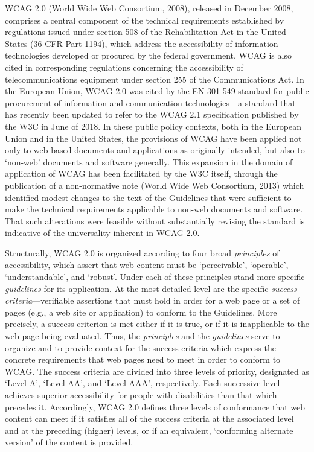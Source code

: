 \documentclass[11.5pt]{sig-alternate} %
\begin{document}
\begin{large}
WCAG 2.0 (World Wide Web Consortium, 2008), released in December 2008, comprises a central component of the technical requirements established by regulations issued under section 508 of the Rehabilitation Act in the United States (36 CFR Part 1194), which address the accessibility of information technologies developed or procured by the federal government. WCAG is also cited in corresponding regulations concerning the accessibility of telecommunications equipment under section 255 of the Communications Act. In the European Union, WCAG 2.0 was cited by the EN 301 549 standard for public procurement of information and communication technologies—a standard that has recently been updated to refer to the WCAG 2.1 specification published by the W3C in June of 2018. In these public policy contexts, both in the European Union and in the United States, the provisions of WCAG have been applied not only to web-based documents and applications as originally intended, but also to ‘non-web’ documents and software generally. This expansion in the domain of application of WCAG has been facilitated by the W3C itself, through the publication of a non-normative note (World Wide Web Consortium, 2013) which identified modest changes to the text of the Guidelines that were sufficient to make the technical requirements applicable to non-web documents and software. That such alterations were feasible without substantially revising the standard is indicative of the universality inherent in WCAG 2.0.
	
Structurally, WCAG 2.0 is organized according to four broad \textit{principles} of accessibility, which assert that web content must be ‘perceivable’, ‘operable’, ‘understandable’, and ‘robust’. Under each of these principles stand more specific \textit{guidelines} for its application. At the most detailed level are the specific \textit{success criteria}—ver\-ifiable assertions that must hold in order for a web page or a set of pages (e.g., a web site or application) to conform to the Guidelines. More precisely, a success criterion is met either if it is true, or if it is inapplicable to the web page being evaluated. Thus, the \textit{principles} and the \textit{guidelines} serve to organize and to provide context for the success criteria which express the concrete requirements that web pages need to meet in order to conform to WCAG. The success criteria are divided into three levels of priority, designated as ‘Level A’, ‘Level AA’, and ‘Level AAA’, respectively. Each successive level achieves superior accessibility for people with disabilities than that which precedes it. Accordingly, WCAG 2.0 defines three levels of conformance that web content can meet if it satisfies all of the success criteria at the associated level and at the preceding (higher) levels, or if an equivalent, ‘conforming alternate version’ of the content is provided.


\end{large}
\end{document}
